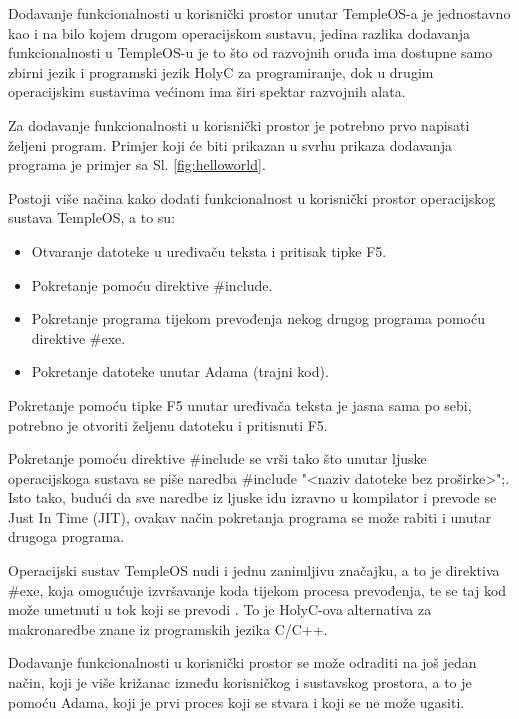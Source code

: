\documentclass{foi}
\begin{document}
Dodavanje funkcionalnosti u korisnički prostor unutar TempleOS-a je jednostavno kao i na bilo kojem drugom operacijskom sustavu, jedina razlika dodavanja funkcionalnosti u Temple\-OS-u je to što od razvojnih oruđa ima dostupne samo zbirni jezik i programski jezik HolyC za programiranje, dok u drugim operacijskim sustavima većinom ima širi spektar razvojnih alata.

Za dodavanje funkcionalnosti u korisnički prostor je potrebno prvo napisati željeni program. Primjer koji će biti prikazan u svrhu prikaza dodavanja programa je primjer sa Sl. \ref{fig:helloworld}.

Postoji više načina kako dodati funkcionalnost u korisnički prostor operacijskog sustava TempleOS, a to su:

\begin{itemize}
    \item Otvaranje datoteke u uređivaču teksta i pritisak tipke {\selectfont F5}.
    \item Pokretanje pomoću direktive {\selectfont \#include}.

    \item Pokretanje programa tijekom prevođenja nekog drugog programa pomoću direktive {\selectfont \#exe}.

    \item Pokretanje datoteke unutar Adama (trajni kod).
\end{itemize}

Pokretanje pomoću tipke {\selectfont F5} unutar uređivača teksta je jasna sama po sebi, potrebno je otvoriti željenu datoteku i pritisnuti {\selectfont F5}.

Pokretanje pomoću direktive {\selectfont \#include} se vrši tako što unutar ljuske operacijskoga sustava se piše naredba {\selectfont \#include "<naziv datoteke bez proširke>";}. Isto tako, budući da sve naredbe iz ljuske idu izravno u kompilator i prevode se Just In Time (JIT), ovakav način pokretanja programa se može rabiti i unutar drugoga programa.

Operacijski sustav TempleOS nudi i jednu zanimljivu značajku, a to je direktiva {\selectfont \#exe}, koja omogućuje izvršavanje koda tijekom procesa prevođenja, te se taj kod može umetnuti u tok koji se prevodi \cite{PreProcessor}. To je HolyC-ova alternativa za makronaredbe znane iz programskih jezika C/C++.

Dodavanje funkcionalnosti u korisnički prostor se može odraditi na još jedan način, koji je više križanac između korisničkog i sustavskog prostora, a to je pomoću Adama, koji je prvi proces koji se stvara i koji se ne može ugasiti.
\end{document}
